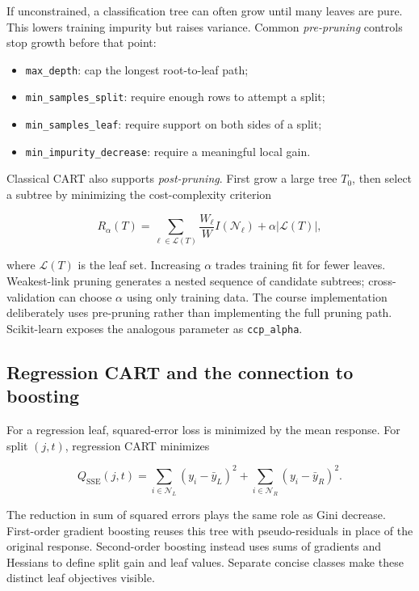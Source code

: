 \documentclass[11pt]{article}
\newcommand{\code}[1]{\texttt{#1}}
\begin{document}
If unconstrained, a classification tree can often grow until many leaves are
pure. This lowers training impurity but raises variance. Common \emph{pre-pruning}
controls stop growth before that point:

\begin{itemize}
\item \code{max\_depth}: cap the longest root-to-leaf path;
\item \code{min\_samples\_split}: require enough rows to attempt a split;
\item \code{min\_samples\_leaf}: require support on both sides of a split;
\item \code{min\_impurity\_decrease}: require a meaningful local gain.
\end{itemize}

Classical CART also supports \emph{post-pruning}. First grow a large tree
$T_0$, then select a subtree by minimizing the cost-complexity criterion

\[
 R_{\alpha}(T)=
 \sum_{\ell\in\mathcal L(T)}\frac{W_{\ell}}{W}I(\mathcal N_{\ell})
 +\alpha\lvert\mathcal L(T)\rvert,
\]

where $\mathcal L(T)$ is the leaf set. Increasing $\alpha$ trades training fit
for fewer leaves. Weakest-link pruning generates a nested sequence of candidate
subtrees; cross-validation can choose $\alpha$ using only training data. The
course implementation deliberately uses pre-pruning rather than implementing
the full pruning path. Scikit-learn exposes the analogous parameter as
\code{ccp\_alpha}.

\subsection{Regression CART and the connection to boosting}

For a regression leaf, squared-error loss is minimized by the mean response.
For split $(j,t)$, regression CART minimizes

\[
 Q_{\mathrm{SSE}}(j,t)=
 \sum_{i\in\mathcal N_L}(y_i-\bar y_L)^2
 +\sum_{i\in\mathcal N_R}(y_i-\bar y_R)^2.
\]

The reduction in sum of squared errors plays the same role as Gini decrease.
First-order gradient boosting reuses this tree with pseudo-residuals in place of
the original response. Second-order boosting instead uses sums of gradients and
Hessians to define split gain and leaf values. Separate concise classes make
these distinct leaf objectives visible.
\end{document}
